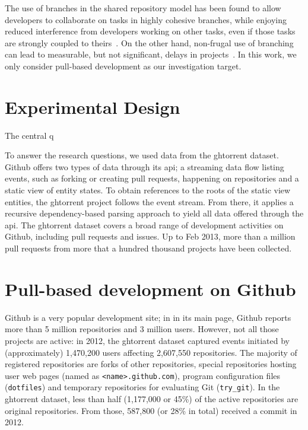 \documentclass{sig-alternate}
\begin{document}
The use of branches in the shared repository model has been found to allow
developers to collaborate on tasks in highly cohesive branches, while enjoying
reduced interference from developers working on other tasks, even if those tasks
are strongly coupled to theirs~\cite{Barr12}. On the other hand, non-frugal
use of branching can lead to measurable, but not significant, delays in 
projects~\cite{Bird12}. In this work, we only consider pull-based development
as our investigation target.

\section{Experimental Design}

The central q

To answer the research questions, we used data from the {\sc ght}orrent dataset.
Github offers two types of data through its {\sc api}; a streaming data flow
listing events, such as forking or creating pull requests, happening on
repositories and a static view of entity states. To obtain references to the
roots of the static view entities, the {\sc ght}orrent project follows the event
stream. From there, it applies a recursive dependency-based parsing approach to
yield all data offered through the {\sc api}. The {\sc ght}orrent dataset covers a
broad range of development activities on Github, including pull requests and
issues. Up to Feb 2013, more than a million pull requests from more that a
hundred thousand projects have been collected.

\section{Pull-based development on Github}

Github is a very popular development site; in in its main page, Github reports
more than 5 million repositories and 3 million users. However,  not all those
projects are active: in 2012, the {\sc ght}orrent dataset captured events initiated by
(approximately) 1,470,200 users affecting 2,607,550 repositories. The majority
of registered repositories are forks of other repositories, special repositories
hosting user web pages (named as \texttt{<name>.github.com}), program
configuration files (\texttt{dotfiles}) and temporary repositories for
evaluating Git (\texttt{try\_git}). In the {\sc ght}orrent dataset, less than half
(1,177,000 or 45\%) of the active repositories are original repositories. From
those, 587,800 (or 28\% in total) received a commit in 2012.
\end{document}
